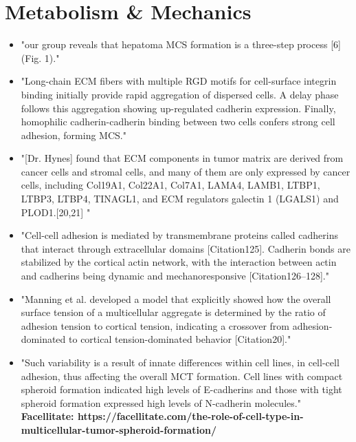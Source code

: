 \documentclass[11pt,a4paper]{article}
\begin{document}
\section{Metabolism \& Mechanics}
\begin{itemize}
\item  "our group reveals that hepatoma MCS formation is a three-step process [6] (Fig. 1)."\cite{Lin2008}
\item "Long-chain ECM fibers with multiple RGD motifs for cell-surface integrin binding initially provide rapid aggregation of dispersed cells. A delay phase follows this aggregation
showing up-regulated cadherin expression. Finally, homophilic cadherin-cadherin binding between two cells confers strong cell adhesion, forming MCS."\cite{Lin2008}
\item "[Dr. Hynes] found that ECM components in tumor matrix
are derived from cancer cells and stromal cells,
and many of them are only expressed by cancer
cells, including Col19A1, Col22A1, Col7A1, LAMA4,
LAMB1, LTBP1, LTBP3, LTBP4, TINAGL1, and ECM
regulators galectin 1 (LGALS1) and PLOD1.[20,21] "\cite{Xiong2016}
\item "Cell-cell adhesion is mediated by transmembrane proteins called cadherins that interact through extracellular domains [Citation125]. Cadherin bonds are stabilized by the cortical actin network, with the interaction between actin and cadherins being dynamic and mechanoresponsive [Citation126–128]."\cite{Boot2021}

\item "Manning et al. developed a model that explicitly showed how the overall surface tension of a multicellular aggregate is determined by the ratio of adhesion tension to cortical tension, indicating a crossover from adhesion-dominated to cortical tension-dominated behavior [Citation20]."\cite{Boot2021}

\item "Such variability is a result of innate differences within cell lines, in cell-cell adhesion, thus affecting the overall MCT formation. Cell lines with compact spheroid formation indicated high levels of E-cadherins and those with tight spheroid formation expressed high levels of N-cadherin molecules." \textbf{Facellitate: https://facellitate.com/the-role-of-cell-type-in-multicellular-tumor-spheroid-formation/}


\end{itemize}
\end{document}
